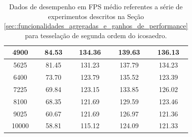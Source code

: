 \documentclass[
    12pt,                %
    oneside,            %
    a4paper,            %
    english,            %
    french,                %
    spanish,            %
    brazil                %
    ]{abntex2}
\begin{document}
\begin{apendicesenv}
\begin{table}[htb]
\begin{tabular}{c|c|c|c|c|}
\multicolumn{1}{|c|}{4900}      &  84.53              & 134.36         & 139.63                & 136.13              \\ \hline
\multicolumn{1}{|c|}{5625}      &  81.45              & 131.23         & 137.79                & 134.23              \\ \hline
\multicolumn{1}{|c|}{6400}      &  73.70              & 123.79         & 135.52                & 123.39              \\ \hline
\multicolumn{1}{|c|}{7225}      &  69.84              & 123.15         & 133.85                & 126.02              \\ \hline
\multicolumn{1}{|c|}{8100}      &  68.35              & 121.69         & 129.59                & 123.46              \\ \hline
\multicolumn{1}{|c|}{9025}      &  60.67              & 121.69         & 126.97                & 121.36              \\ \hline
\multicolumn{1}{|c|}{10000}     &  58.81              & 115.12         & 124.09                & 121.33              \\ \hline
\end{tabular}
\caption{Dados de desempenho em FPS médio referentes a série de experimentos descritos na Seção \ref{sec::funcionalidades_agregadas_e_ganhos_de_performance} para tesselação de segunda ordem do icosaedro.}
\label{tab::testes_2}
\end{table}


\end{apendicesenv}
\end{document}

